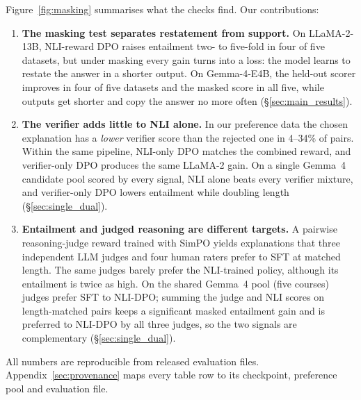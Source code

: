 Figure~\ref{fig:masking} summarises what the checks find. Our contributions:
\begin{enumerate}
\item \textbf{The masking test separates restatement from support.} On LLaMA-2-13B, NLI-reward DPO raises entailment two- to five-fold in four of five datasets, but under masking every gain turns into a loss: the model learns to restate the answer in a shorter output. On Gemma-4-E4B, the held-out scorer improves in four of five datasets and the masked score in all five, while outputs get shorter and copy the answer no more often (\S\ref{sec:main_results}).
\item \textbf{The verifier adds little to NLI alone.} In our preference data the chosen explanation has a \emph{lower} verifier score than the rejected one in 4--34\% of pairs. Within the same pipeline, NLI-only DPO matches the combined reward, and verifier-only DPO produces the same LLaMA-2 gain. On a single Gemma~4 candidate pool scored by every signal, NLI alone beats every verifier mixture, and verifier-only DPO lowers entailment while doubling length (\S\ref{sec:single_dual}).
\item \textbf{Entailment and judged reasoning are different targets.} A pairwise reasoning-judge reward trained with SimPO \citep{meng2024simpo} yields explanations that three independent LLM judges and four human raters prefer to SFT at matched length. The same judges barely prefer the NLI-trained policy, although its entailment is twice as high. On the shared Gemma~4 pool (five courses) judges prefer SFT to NLI-DPO; summing the judge and NLI scores on length-matched pairs keeps a significant masked entailment gain and is preferred to NLI-DPO by all three judges, so the two signals are complementary (\S\ref{sec:single_dual}).
\end{enumerate}
\noindent All numbers are reproducible from released evaluation files. Appendix~\ref{sec:provenance} maps every table row to its checkpoint, preference pool and evaluation file.
